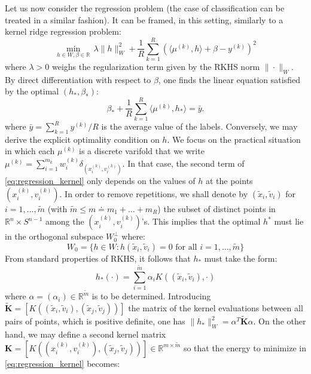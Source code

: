 \documentclass[11pt]{article}
\newcommand{\R}{\mathbb{R}}
\begin{document}
Let us now consider the regression problem (the case of classification can be treated in a similar fashion). It can be framed, in this setting, similarly to a kernel ridge regression problem:
\begin{equation}
\label{eq:regression_kernel}
 \min_{h \in W, \beta \in \R} \, \lambda \|h\|_{W}^2 + \frac{1}{R} \sum_{k=1}^R \left( \langle \mu^{(k)},h\rangle + \beta - y^{(k)} \right)^2
\end{equation}
where $\lambda >0$ weighs the regularization term given by the RKHS norm $\|\cdot\|_{W}$. By direct differentiation with respect to $\beta$, one finds the linear equation satisfied by the optimal $(h_*,\beta_*)$:
\begin{equation}
\label{eq:regression_kernel1}
 \beta_* + \frac{1}{R}\sum_{k=1}^{R} \langle \mu^{(k)},h_*\rangle = \bar{y}.
\end{equation}
where $\bar{y} = \sum_{k=1}^{R} y^{(k)} /R$ is the average value of the labels. Conversely, we may derive the explicit optimality condition on $h$. We focus on the practical situation in which each $\mu^{(k)}$ is a discrete varifold that we write $\mu^{(k)} = \sum_{i=1}^{m_k} w_{i}^{(k)}\delta_{(x_{i}^{(k)},v_{i}^{(k)})}$. In that case, the second term of \eqref{eq:regression_kernel} only depends on the values of $h$ at the points $(x_i^{(k)},v_i^{(k)})$. In order to remove repetitions, we shall denote by $(\tilde{x}_i,\tilde{v}_i)$ for $i=1,\ldots,\tilde{m}$ (with $\tilde{m} \leq m \doteq m_1+\ldots+m_R$) the subset of distinct points in $\R^n \times S^{n-1}$ among the $(x_i^{(k)},v_i^{(k)})$'s. This implies that the optimal $h^*$ must lie in the orthogonal subspace $W_0^\bot$ where:
\begin{equation*}
 W_0 = \{h \in W: h(\tilde{x}_i,\tilde{v}_i) = 0 \text{ for all } i=1,\ldots,\tilde{m}\}
\end{equation*}
From standard properties of RKHS, it follows that $h_*$ must take the form:
\begin{equation*}
 h_*(\cdot) = \sum_{i=1}^{\tilde{m}} \alpha_i K((\tilde{x}_i,\tilde{v}_i),\cdot)
\end{equation*}
where $\alpha = (\alpha_i)\in\R^{\tilde{m}}$ is to be determined. Introducing $\tilde{\mathbf{K}} = [K((\tilde{x}_i,\tilde{v}_i),(\tilde{x}_j,\tilde{v}_j))]$ the matrix of the kernel evaluations between all pairs of points, which is positive definite, one has $\|h_*\|_W^2 = \alpha^T \tilde{\mathbf{K}} \alpha$.
On the other hand, we may define a second kernel matrix $\mathbf{K} = [K((x_i^{(k)},v_i^{(k)}),(\tilde{x}_j,\tilde{v}_j))] \in \R^{m \times \tilde{m}}$ so that the energy to minimize in \eqref{eq:regression_kernel} becomes:
\end{document}
